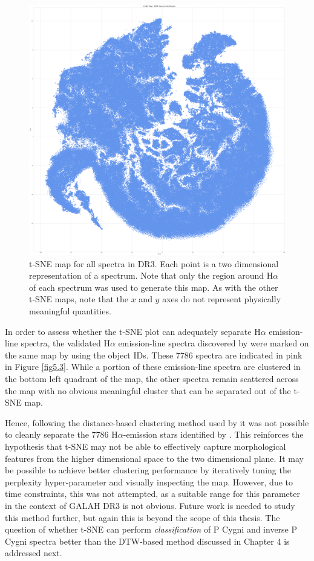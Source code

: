 \begin{figure}[!htb]
\centering
\includegraphics[scale=0.12]{figures/t-sne halpha masked.png}
\caption{t-SNE map for all spectra in DR3. Each point is a two dimensional representation of a spectrum. Note that only the region around H$\alpha$ of each spectrum was used to generate this map. As with the other t-SNE maps, note that the $x$ and $y$ axes do not represent physically meaningful quantities.}
\label{fig5.2}
\end{figure}

In order to assess whether the t-SNE plot can adequately separate H$\alpha$ emission-line spectra, the validated H$\alpha$ emission-line spectra discovered by \citet{vcotar2021galah} were marked on the same map by using the object IDs. These 7786 spectra are indicated in pink in Figure \ref{fig5.3}. While a portion of these emission-line spectra are clustered in the bottom left quadrant of the map, the other spectra remain scattered across the map with no obvious meaningful cluster that can be separated out of the t-SNE map. 

Hence, following the distance-based clustering method used by \citet{traven2017galah} it was not possible to cleanly separate the 7786 H$\alpha$-emission stars identified by \citet{vcotar2021galah}. This reinforces the hypothesis that t-SNE may not be able to effectively capture morphological features from the higher dimensional space to the two dimensional plane. It may be possible to achieve better clustering performance by iteratively tuning the perplexity hyper-parameter and visually inspecting the map. However, due to time constraints, this was not attempted, as a suitable range for this parameter in the context of GALAH DR3 is not obvious. Future work is needed to study this method further, but again this is beyond the scope of this thesis. The question of whether t-SNE can perform {\em classification} of P Cygni and inverse P Cygni spectra better than  the DTW-based method discussed in Chapter 4 is addressed next. 

